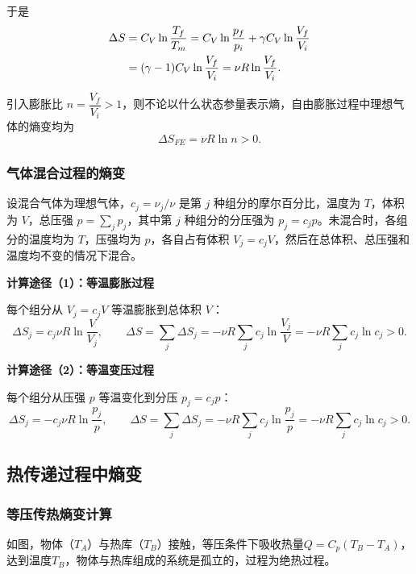 \documentclass[UTF8]{ctexart}
\theoremstyle{definition}
\begin{document}
于是
\begin{align}
\Delta S&=C_V\ln\frac{T_f}{T_m}
=C_V\ln\frac{p_f}{p_i}+\gamma C_V\ln\frac{V_f}{V_i} \notag\\
&=(\gamma-1)C_V\ln\frac{V_f}{V_i}
=\nu R\ln\frac{V_f}{V_i}.
\end{align}

引入膨胀比 $n=\dfrac{V_f}{V_i}>1$，则不论以什么状态参量表示熵，自由膨胀过程中理想气体的熵变均为
\begin{equation}
\boxed{\Delta S_{FE}=\nu R\ln n>0.}
\end{equation}

\subsubsection*{气体混合过程的熵变}

设混合气体为理想气体，$c_j=\nu_j/\nu$ 是第 $j$ 种组分的摩尔百分比，温度为 $T$，体积为 $V$，总压强 $p=\sum_j p_j$，其中第 $j$ 种组分的分压强为 $p_j=c_j p$。未混合时，各组分的温度均为 $T$，压强均为 $p$，各自占有体积 $V_j=c_j V$，然后在总体积、总压强和温度均不变的情况下混合。

\textbf{计算途径（1）：等温膨胀过程}

每个组分从 $V_j=c_j V$ 等温膨胀到总体积 $V$：
\begin{equation}
\Delta S_j=c_j\nu R\ln\frac{V}{V_j},\qquad
\Delta S=\sum_j\Delta S_j=-\nu R\sum_j c_j\ln\frac{V_j}{V}
=-\nu R\sum_j c_j\ln c_j>0.
\end{equation}

\textbf{计算途径（2）：等温变压过程}

每个组分从压强 $p$ 等温变化到分压 $p_j=c_j p$：
\begin{equation}
\Delta S_j=-c_j\nu R\ln\frac{p_j}{p},\qquad
\Delta S=\sum_j\Delta S_j=-\nu R\sum_j c_j\ln\frac{p_j}{p}
=-\nu R\sum_j c_j\ln c_j>0.
\end{equation}

\subsection{热传递过程中熵变}

\subsubsection*{等压传热熵变计算}

如图，物体（$T_A$）与热库（$T_B$）接触，等压条件下吸收热量$Q=C_p(T_B-T_A)$，达到温度$T_B$，物体与热库组成的系统是孤立的，过程为绝热过程。
\end{document}
